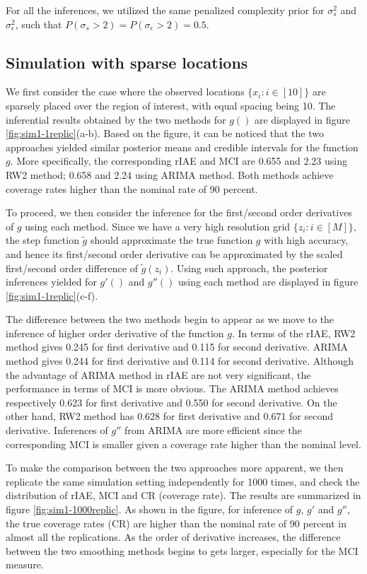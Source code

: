 \documentclass{article}
\begin{document}
For all the inferences, we utilized the same penalized complexity prior \citep{simpson2017penalising} for $\sigma_s^2$ and $\sigma_\epsilon^2$, such that $P(\sigma_s > 2) = P(\sigma_\epsilon > 2) = 0.5$.


\subsection{Simulation with sparse locations}

We first consider the case where the observed locations $\{x_i: i \in [10] \}$ are sparsely placed over the region of interest, with equal spacing being 10. The inferential results obtained by the two methods for $g()$ are displayed in figure \ref{fig:sim1-1replic}(a-b). Based on the figure, it can be noticed that the two approaches yielded similar posterior means and credible intervals for the function $g$. More specifically, the corresponding rIAE and MCI are 0.655 and 2.23 using RW2 method; 0.658 and 2.24 using ARIMA method. Both methods achieve coverage rates higher than the nominal rate of 90 percent. 

To proceed, we then consider the inference for the first/second order derivatives of $g$ using each method. Since we have a very high resolution grid $\{z_i: i\in [M]\}$, the step function $\tilde{g}$ should approximate the true function $g$ with high accuracy, and hence its first/second order derivative can be approximated by the scaled first/second order difference of $\tilde{g}(z_i)$. Using such approach, the posterior inferences yielded for $g'()$ and $g''()$ using each method are displayed in figure \ref{fig:sim1-1replic}(c-f). 

The difference between the two methods begin to appear as we move to the inference of higher order derivative of the function $g$. In terms of the rIAE, RW2 method gives 0.245 for first derivative and 0.115 for second derivative. ARIMA method gives 0.244 for first derivative and 0.114 for second derivative. Although the advantage of ARIMA method in rIAE are not very significant, the performance in terms of MCI is more obvious. The ARIMA method achieves respectively 0.623 for first derivative and 0.550 for second derivative. On the other hand, RW2 method has 0.628 for first derivative and 0.671 for second derivative. Inferences of $g''$ from ARIMA are more efficient since the corresponding MCI is smaller given a coverage rate higher than the nominal level.

To make the comparison between the two approaches more apparent, we then replicate the same simulation setting independently for 1000 times, and check the distribution of rIAE, MCI and CR (coverage rate). The results are summarized in figure \ref{fig:sim1-1000replic}. As shown in the figure, for inference of $g$, $g'$ and $g''$, the true coverage rates (CR) are higher than the nominal rate of 90 percent in almost all the replications. As the order of derivative increases, the difference between the two smoothing methods begins to gets larger, especially for the MCI measure. 
\end{document}
